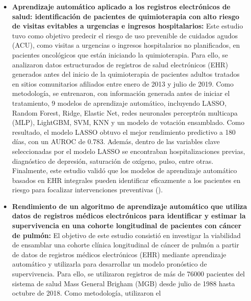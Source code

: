\begin{itemize}
    \item \textbf{Aprendizaje automático aplicado a los registros electrónicos de salud: identificación de pacientes de quimioterapia con alto riesgo de visitas evitables a urgencias e ingresos hospitalarios:} Este estudio tuvo como objetivo predecir el riesgo de uso prevenible de cuidados agudos (ACU), como visitas a urgencias o ingresos hospitalarios no planificados, en pacientes oncológicos que están iniciando la quimioterapia. Para ello, se analizaron datos estructurados de registros de salud electrónicos (EHR) generados antes del inicio de la quimioterapia de pacientes adultos tratados en sitios comunitarios afiliados entre enero de 2013 y julio de 2019. Como metodología, se entrenaron, con información generada antes de iniciar el tratamiento, 9 modelos de aprendizaje automático, incluyendo LASSO, Random Forest, Ridge, Elastic Net, redes neuronales perceptrón multicapa (MLP), LightGBM, SVM, KNN y un modelo de votación ensamblado. Como resultado, el modelo LASSO obtuvo el mejor rendimiento predictivo a 180 días, con un AUROC de 0.783. Además, dentro de las variables clave seleccionadas por el modelo LASSO se encontraban hospitalizaciones previas, diagnóstico de depresión, saturación de oxígeno, pulso, entre otras. Finalmente, este estudio validó que los modelos de aprendizaje automático basados en EHR integrales pueden identificar eficazmente a los pacientes en riesgo para focalizar intervenciones preventivas (\cite{article8}).
    \item \textbf{Rendimiento de un algoritmo de aprendizaje automático que utiliza datos de registros médicos electrónicos para identificar y estimar la supervivencia en una cohorte longitudinal de pacientes con cáncer de pulmón:} El objetivo de este estudio consistió en investigar la viabilidad de ensamblar una cohorte clínica longitudinal de cáncer de pulmón a partir de datos de registros médicos electrónicos (EHR) mediante aprendizaje automático y utilizarla para desarrollar un modelo pronóstico de supervivencia. Para ello, se utilizaron registros de más de 76000 pacientes del sistema de salud Mass General Brigham (MGB) desde julio de 1988 hasta octubre de 2018. Como metodología, utilizaron el 

\end{itemize}
